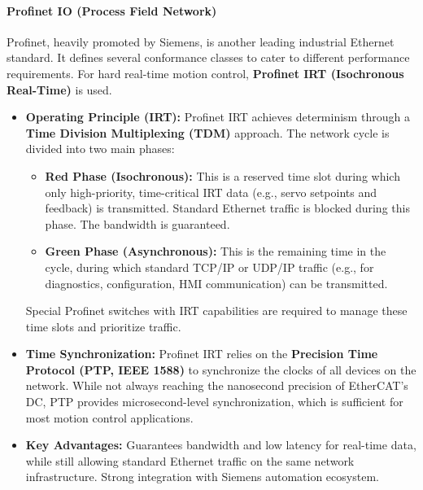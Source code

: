 \paragraph{Profinet IO (Process Field Network)}
Profinet, heavily promoted by Siemens, is another leading industrial Ethernet standard. It defines several conformance classes to cater to different performance requirements. For hard real-time motion control, \textbf{Profinet IRT (Isochronous Real-Time)} is used.
\begin{itemize}
    \item \textbf{Operating Principle (IRT):} Profinet IRT achieves determinism through a \textbf{Time Division Multiplexing (TDM)} approach. The network cycle is divided into two main phases:
        \begin{itemize}
            \item \textbf{Red Phase (Isochronous):} This is a reserved time slot during which only high-priority, time-critical IRT data (e.g., servo setpoints and feedback) is transmitted. Standard Ethernet traffic is blocked during this phase. The bandwidth is guaranteed.
            \item \textbf{Green Phase (Asynchronous):} This is the remaining time in the cycle, during which standard TCP/IP or UDP/IP traffic (e.g., for diagnostics, configuration, HMI communication) can be transmitted.
        \end{itemize}
        Special Profinet switches with IRT capabilities are required to manage these time slots and prioritize traffic.
    \item \textbf{Time Synchronization:} Profinet IRT relies on the \textbf{Precision Time Protocol (PTP, IEEE 1588)} to synchronize the clocks of all devices on the network. While not always reaching the nanosecond precision of EtherCAT's DC, PTP provides microsecond-level synchronization, which is sufficient for most motion control applications.
    \item \textbf{Key Advantages:} Guarantees bandwidth and low latency for real-time data, while still allowing standard Ethernet traffic on the same network infrastructure. Strong integration with Siemens automation ecosystem.
\end{itemize}


